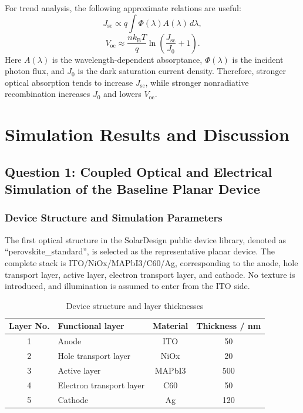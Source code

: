\documentclass[12pt,a4paper,UTF8]{article}
\begin{document}
For trend analysis, the following approximate relations are useful:
\begin{equation}
    J_\mathrm{sc}\propto q\int \Phi(\lambda)A(\lambda)\,d\lambda,
    \label{eq:jsc-abs}
\end{equation}
\begin{equation}
    V_\mathrm{oc}\approx \frac{nk_\mathrm{B}T}{q}
    \ln\left(\frac{J_\mathrm{sc}}{J_0}+1\right).
    \label{eq:voc-j0}
\end{equation}
Here $A(\lambda)$ is the wavelength-dependent absorptance, $\Phi(\lambda)$ is the incident photon flux, and $J_0$ is the dark saturation current density. Therefore, stronger optical absorption tends to increase $J_\mathrm{sc}$, while stronger nonradiative recombination increases $J_0$ and lowers $V_\mathrm{oc}$.

\section{Simulation Results and Discussion}
\subsection{Question 1: Coupled Optical and Electrical Simulation of the Baseline Planar Device}
\subsubsection{Device Structure and Simulation Parameters}
The first optical structure in the SolarDesign public device library, denoted as ``perovskite\_standard'', is selected as the representative planar device. The complete stack is ITO/NiOx/MAPbI3/C60/Ag, corresponding to the anode, hole transport layer, active layer, electron transport layer, and cathode. No texture is introduced, and illumination is assumed to enter from the ITO side.

\begin{table}[H]
    \centering
    \caption{Device structure and layer thicknesses}
    \begin{tabular}{@{}clcc@{}}
        \toprule
        Layer No. & Functional layer & Material & Thickness / nm \\
        \midrule
        1 & Anode & ITO & 50 \\
        2 & Hole transport layer & NiOx & 20 \\
        3 & Active layer & MAPbI3 & 500 \\
        4 & Electron transport layer & C60 & 50 \\
        5 & Cathode & Ag & 120 \\
        \bottomrule
    \end{tabular}
\end{table}
\end{document}
